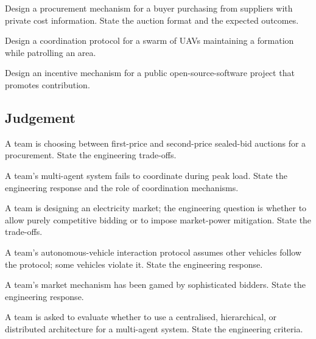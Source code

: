 \begin{exercise}
Design a procurement mechanism for a buyer purchasing from suppliers with private cost information. State the auction format and the expected outcomes.
\end{exercise}

\begin{exercise}
Design a coordination protocol for a swarm of UAVs maintaining a formation while patrolling an area.
\end{exercise}

\begin{exercise}
Design an incentive mechanism for a public open-source-software project that promotes contribution.
\end{exercise}

\subsection*{Judgement}

\begin{exercise}
A team is choosing between first-price and second-price sealed-bid auctions for a procurement. State the engineering trade-offs.
\end{exercise}

\begin{exercise}
A team's multi-agent system fails to coordinate during peak load. State the engineering response and the role of coordination mechanisms.
\end{exercise}

\begin{exercise}
A team is designing an electricity market; the engineering question is whether to allow purely competitive bidding or to impose market-power mitigation. State the trade-offs.
\end{exercise}

\begin{exercise}
A team's autonomous-vehicle interaction protocol assumes other vehicles follow the protocol; some vehicles violate it. State the engineering response.
\end{exercise}

\begin{exercise}
A team's market mechanism has been gamed by sophisticated bidders. State the engineering response.
\end{exercise}

\begin{exercise}
A team is asked to evaluate whether to use a centralised, hierarchical, or distributed architecture for a multi-agent system. State the engineering criteria.
\end{exercise}

